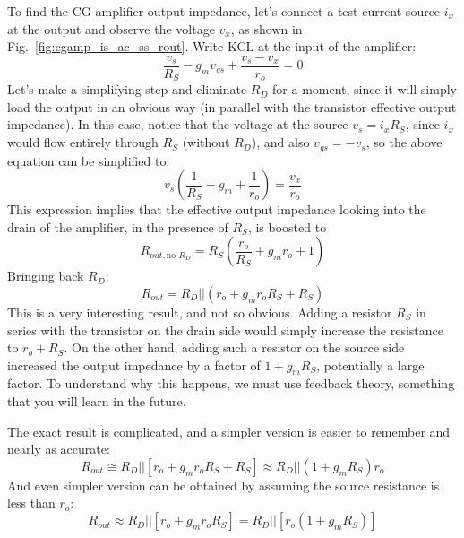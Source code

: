 To find the CG amplifier output impedance, let's connect a test current source $i_x$ at the output and observe the voltage $v_x$, as shown in Fig.~\ref{fig:cgamp_is_ac_ss_rout}.  Write KCL at the input of the amplifier:
\begin{equation}
	\frac{{{v_s}}}{{{R_S}}} - {g_m}{v_{gs}} + \frac{{{v_s} - {v_x}}}{{{r_o}}} = 0
\end{equation}
Let's make a simplifying step and eliminate $R_D$ for a moment, since it will simply load the output in an obvious way (in parallel with the transistor effective output impedance).  In this case, notice that the voltage at the source $v_s = i_x R_S$, since $i_x$ would flow entirely through $R_S$ (without $R_D$), and also $v_{gs} = -v_s$, so the above equation can be simplified to:
\begin{equation}
	{v_s}\left( {\frac{1}{{{R_S}}} + {g_m} + \frac{1}{{{r_o}}}} \right) = \frac{{{v_x}}}{{{r_o}}}
\end{equation}
This expression implies that the effective output impedance looking into the drain of the amplifier, in the presence of $R_S$, is boosted to
\begin{equation}
	R_{out,\text{no $R_D$}} =  {{R_S}\left( {\frac{{{r_o}}}{{{R_S}}} + {g_m}{r_o} + 1} \right)} 
\end{equation}
Bringing back $R_D$:
\begin{equation}
	{R_{out}} = {R_D}||\left( {{r_o} + {g_m}{r_o}{R_S} + {R_S}} \right) 
\end{equation}
This is a very interesting result, and not so obvious.  Adding a resistor $R_S$ in series with the transistor on the drain side would simply increase the resistance to $r_o + R_S$.  On the other hand, adding such a resistor on the source side increased the output impedance by a factor of $1 + g_m R_S$, potentially a large factor.  To understand why this happens, we must use feedback theory, something that you will learn in the future.

The exact result is complicated, and a simpler version is easier to remember and nearly as accurate:
\begin{equation} 
	{R_{out}} \cong {R_D}||[{r_o} + {g_m}{r_o}{R_S} + {R_S}] \approx R_D || (1 + g_m R_S) r_o
\end{equation}
And even simpler version can be obtained by assuming the source resistance is less than $r_o$:
\begin{equation} 
{R_{out}} \approx {R_D}||[{r_o} + {g_m}{r_o}{R_S}] = {R_D}||[{r_o}(1 + {g_m}{R_S})]
\end{equation}
